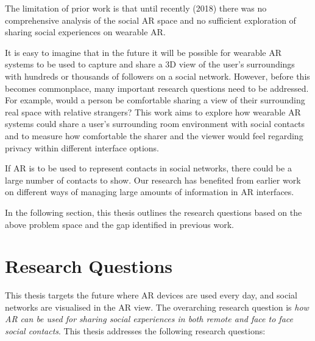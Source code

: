 The limitation of prior work is that until recently (2018) there was no comprehensive analysis of the social AR space and no sufficient exploration of sharing social experiences on wearable AR. 

It is easy to imagine that in the future it will be possible for wearable AR systems to be used to capture and share a 3D view of the user's surroundings with hundreds or thousands of followers on a social network. However, before this becomes commonplace, many important research questions need to be addressed. For example, would a person be comfortable sharing a view of their surrounding real space with relative strangers? This work aims to explore how wearable AR systems could share a user’s surrounding room environment with social contacts and to measure how comfortable the sharer and the viewer would feel regarding privacy within different interface options. 

If AR is to be used to represent contacts in social networks, there could be a large number of contacts to show. Our research has benefited from earlier work on different ways of managing large amounts of information in AR interfaces.

In the following section, this thesis outlines the research questions based on the above problem space and the gap identified in previous work.

\section{Research Questions}

This thesis targets the future where AR devices are used every day, and social networks are visualised in the AR view. The overarching research question is \textit{how AR can be used for sharing social experiences in both remote and face to face social contacts}. This thesis addresses the following research questions: 

